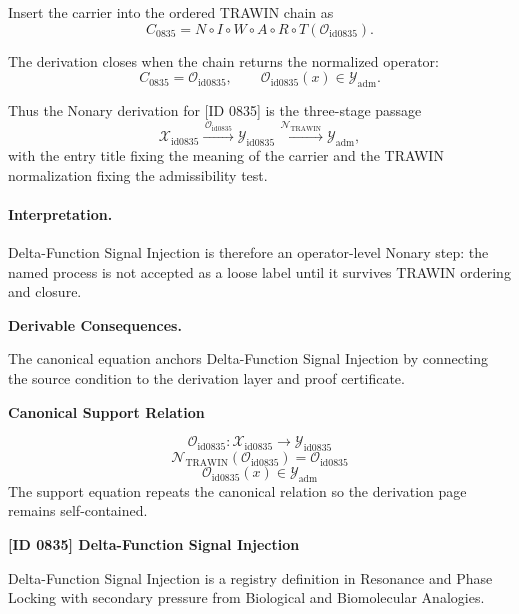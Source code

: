 Insert the carrier into the ordered TRAWIN chain as\[
C_{0835}=N\circ I\circ W\circ A\circ R\circ T(\mathcal{O}_{\mathrm{id0835}}).
\]

The derivation closes when the chain returns the normalized operator:\[
C_{0835}=\mathcal{O}_{\mathrm{id0835}},\qquad \mathcal{O}_{\mathrm{id0835}}(x)\in\mathcal{Y}_{\mathrm{adm}}.
\]

Thus the Nonary derivation for [ID 0835] is the three-stage passage
\[
\mathcal{X}_{\mathrm{id0835}}\xrightarrow{\,\mathcal{O}_{\mathrm{id0835}}\,} \mathcal{Y}_{\mathrm{id0835}}\xrightarrow{\,\mathcal{N}_{\mathrm{TRAWIN}}\,} \mathcal{Y}_{\mathrm{adm}},
\]
with the entry title fixing the meaning of the carrier and the TRAWIN normalization fixing the admissibility test.

\paragraph{Interpretation.} Delta-Function Signal Injection is therefore an operator-level Nonary step: the named process is not accepted as a loose label until it survives TRAWIN ordering and closure.

\par\vspace{0.35em}
\noindent\textbf{Derivable Consequences.}\quad
\begingroup
\footnotesize
\raggedright
The canonical equation anchors Delta-Function Signal Injection by connecting the source condition to the derivation layer and proof certificate.
\par\endgroup

\noindent\textbf{Canonical Support Relation}\par
\[
\mathcal{O}_{\mathrm{id0835}}:\mathcal{X}_{\mathrm{id0835}}\longrightarrow\mathcal{Y}_{\mathrm{id0835}}
\]
\[
\mathcal{N}_{\mathrm{TRAWIN}}(\mathcal{O}_{\mathrm{id0835}})=\mathcal{O}_{\mathrm{id0835}}
\]
\[
\mathcal{O}_{\mathrm{id0835}}(x)\in\mathcal{Y}_{\mathrm{adm}}
\]
\noindent The support equation repeats the canonical relation so the derivation page remains self-contained.\par

\clearpage
\noindent\textbf{[ID 0835] Delta-Function Signal Injection}\par
\vspace{0.35em}
\begingroup\small
{}
Delta-Function Signal Injection is a registry definition in Resonance and Phase Locking with secondary pressure from Biological and Biomolecular Analogies.

